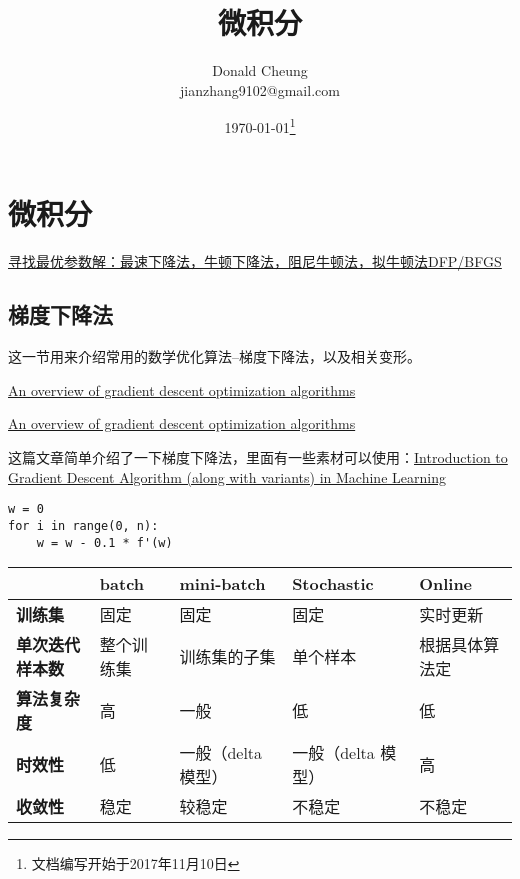 \documentclass[a4paper,10pt]{ctexbook}
\title{微积分}
\author{Donald Cheung\\jianzhang9102@gmail.com}
\date{\today \footnote{文档编写开始于2017年11月10日}}
\begin{document}
    \maketitle
    \tableofcontents
\fi

\chapter{微积分}
\href{http://dataunion.org/20714.html}{寻找最优参数解：最速下降法，牛顿下降法，阻尼牛顿法，拟牛顿法DFP/BFGS}

\section{梯度下降法}
这一节用来介绍常用的数学优化算法--梯度下降法，以及相关变形。

\href{https://arxiv.org/abs/1609.04747}{An overview of gradient descent optimization algorithms}

\href{http://ruder.io/optimizing-gradient-descent}{An overview of gradient descent optimization algorithms}

这篇文章简单介绍了一下梯度下降法，里面有一些素材可以使用：\href{https://www.analyticsvidhya.com/blog/2017/03/introduction-to-gradient-descent-algorithm-along-its-variants}{Introduction to Gradient Descent Algorithm (along with variants) in Machine Learning}

\begin{verbatim}
w = 0
for i in range(0, n):
    w = w - 0.1 * f'(w)
\end{verbatim}

\begin{table}[H]
    \begin{tabular}{|l|l|l|l|l|}
        \hline
                                & \textbf{batch} & \textbf{mini-batch} & \textbf{Stochastic} & \textbf{Online} \\
        \hline
        \textbf{训练集}         & 固定       & 固定               & 固定               & 实时更新 \\
        \hline
        \textbf{单次迭代样本数} & 整个训练集 & 训练集的子集       & 单个样本           & 根据具体算法定 \\
        \hline
        \textbf{算法复杂度}     & 高         & 一般               & 低                 & 低 \\
        \hline
        \textbf{时效性}         & 低         & 一般（delta 模型） & 一般（delta 模型） & 高 \\
        \hline
        \textbf{收敛性}         & 稳定       & 较稳定             & 不稳定             & 不稳定 \\
        \hline
    \end{tabular}
\end{table}
        
\end{document}

